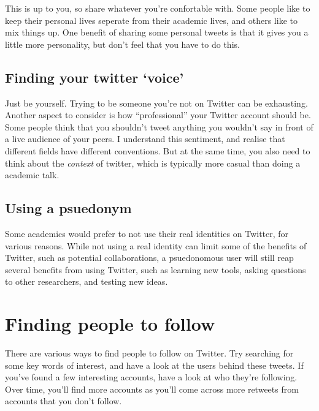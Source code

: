 \documentclass[]{book}
\begin{document}
This is up to you, so share whatever you're confortable with. Some people like to keep their personal lives seperate from their academic lives, and others like to mix things up. One benefit of sharing some personal tweets is that it gives you a little more personality, but don't feel that you have to do this.

\hypertarget{finding-your-twitter-voice}{%
\subsection{Finding your twitter `voice'}\label{finding-your-twitter-voice}}

Just be yourself. Trying to be someone you're not on Twitter can be exhausting. Another aspect to consider is how ``professional'' your Twitter account should be. Some people think that you shouldn't tweet anything you wouldn't say in front of a live audience of your peers. I understand this sentiment, and realise that different fields have different conventions. But at the same time, you also need to think about the \emph{context} of twitter, which is typically more casual than doing a academic talk.

\hypertarget{using-a-psuedonym}{%
\subsection{Using a psuedonym}\label{using-a-psuedonym}}

Some academics would prefer to not use their real identities on Twitter, for various reasons. While not using a real identity can limit some of the benefits of Twitter, such as potential collaborations, a psuedonomous user will still reap several benefits from using Twitter, such as learning new tools, asking questions to other researchers, and testing new ideas.

\hypertarget{finding-people-to-follow}{%
\section{Finding people to follow}\label{finding-people-to-follow}}

There are various ways to find people to follow on Twitter. Try searching for some key words of interest, and have a look at the users behind these tweets. If you've found a few interesting accounts, have a look at who they're following. Over time, you'll find more accounts as you'll come across more retweets from accounts that you don't follow.
\end{document}
